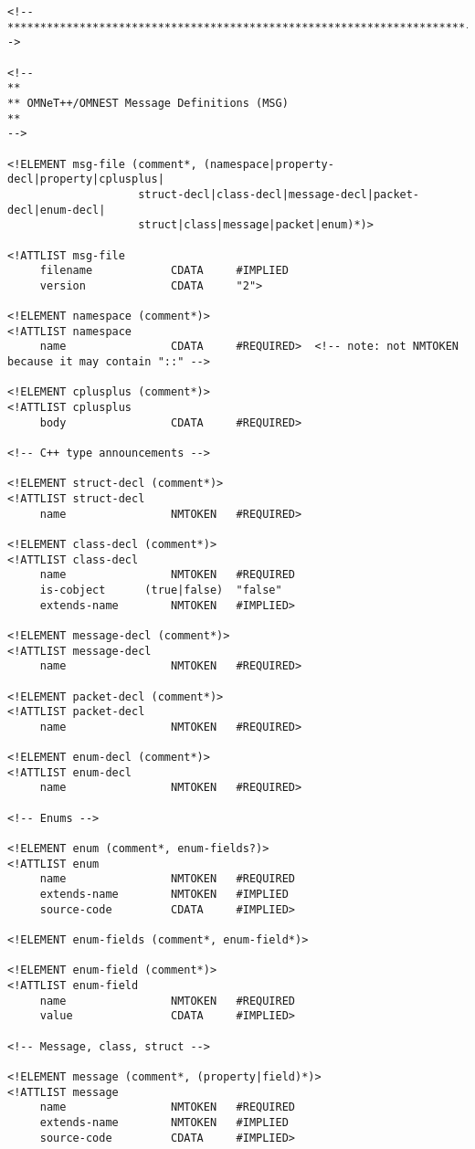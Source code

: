 \begin{verbatim}
<!--**********************************************************************-->

<!--
**
** OMNeT++/OMNEST Message Definitions (MSG)
**
-->

<!ELEMENT msg-file (comment*, (namespace|property-decl|property|cplusplus|
                    struct-decl|class-decl|message-decl|packet-decl|enum-decl|
                    struct|class|message|packet|enum)*)>

<!ATTLIST msg-file
     filename            CDATA     #IMPLIED
     version             CDATA     "2">

<!ELEMENT namespace (comment*)>
<!ATTLIST namespace
     name                CDATA     #REQUIRED>  <!-- note: not NMTOKEN because it may contain "::" -->

<!ELEMENT cplusplus (comment*)>
<!ATTLIST cplusplus
     body                CDATA     #REQUIRED>

<!-- C++ type announcements -->

<!ELEMENT struct-decl (comment*)>
<!ATTLIST struct-decl
     name                NMTOKEN   #REQUIRED>

<!ELEMENT class-decl (comment*)>
<!ATTLIST class-decl
     name                NMTOKEN   #REQUIRED
     is-cobject      (true|false)  "false"
     extends-name        NMTOKEN   #IMPLIED>

<!ELEMENT message-decl (comment*)>
<!ATTLIST message-decl
     name                NMTOKEN   #REQUIRED>

<!ELEMENT packet-decl (comment*)>
<!ATTLIST packet-decl
     name                NMTOKEN   #REQUIRED>

<!ELEMENT enum-decl (comment*)>
<!ATTLIST enum-decl
     name                NMTOKEN   #REQUIRED>

<!-- Enums -->

<!ELEMENT enum (comment*, enum-fields?)>
<!ATTLIST enum
     name                NMTOKEN   #REQUIRED
     extends-name        NMTOKEN   #IMPLIED
     source-code         CDATA     #IMPLIED>

<!ELEMENT enum-fields (comment*, enum-field*)>

<!ELEMENT enum-field (comment*)>
<!ATTLIST enum-field
     name                NMTOKEN   #REQUIRED
     value               CDATA     #IMPLIED>

<!-- Message, class, struct -->

<!ELEMENT message (comment*, (property|field)*)>
<!ATTLIST message
     name                NMTOKEN   #REQUIRED
     extends-name        NMTOKEN   #IMPLIED
     source-code         CDATA     #IMPLIED>


\end{verbatim}
